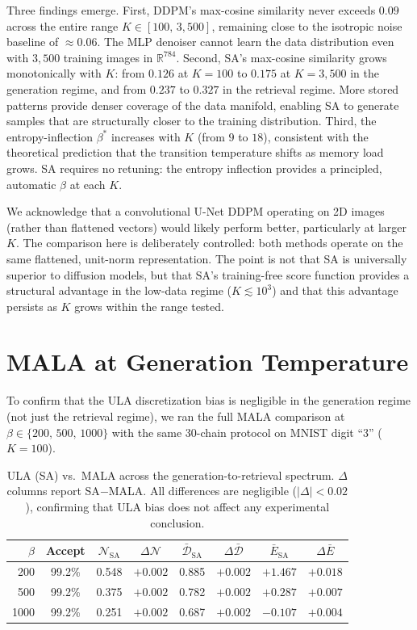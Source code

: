 Three findings emerge. First, DDPM's max-cosine similarity never exceeds $0.09$ across the entire range $K\in[100,\,3{,}500]$, remaining close to the isotropic noise baseline of ${\approx}0.06$. The MLP denoiser cannot learn the data distribution even with $3{,}500$ training images in $\mathbb{R}^{784}$. Second, SA's max-cosine similarity grows monotonically with $K$: from $0.126$ at $K{=}100$ to $0.175$ at $K{=}3{,}500$ in the generation regime, and from $0.237$ to $0.327$ in the retrieval regime. More stored patterns provide denser coverage of the data manifold, enabling SA to generate samples that are structurally closer to the training distribution. Third, the entropy-inflection $\beta^*$ increases with $K$ (from $9$ to $18$), consistent with the theoretical prediction that the transition temperature shifts as memory load grows. SA requires no retuning: the entropy inflection provides a principled, automatic $\beta$ at each $K$.

We acknowledge that a convolutional U-Net DDPM operating on 2D images (rather than flattened vectors) would likely perform better, particularly at larger $K$. The comparison here is deliberately controlled: both methods operate on the same flattened, unit-norm representation. The point is not that SA is universally superior to diffusion models, but that SA's training-free score function provides a structural advantage in the low-data regime ($K\lesssim 10^3$) and that this advantage persists as $K$ grows within the range tested.

\section{MALA at Generation Temperature}\label{app:mala-generation}

To confirm that the ULA discretization bias is negligible in the generation regime (not just the retrieval regime), we ran the full MALA comparison at $\beta\in\{200,\,500,\,1000\}$ with the same 30-chain protocol on MNIST digit ``3'' ($K{=}100$).

\begin{table}[h]
\centering
\caption{ULA (SA) vs.\ MALA across the generation-to-retrieval spectrum. $\Delta$ columns report SA$-$MALA. All differences are negligible ($|\Delta|<0.02$), confirming that ULA bias does not affect any experimental conclusion.}
\label{tab:mala-generation}
\small
\begin{tabular}{@{}rccccccc@{}}
\toprule
$\beta$ & Accept & $\mathcal{N}_{\text{SA}}$ & $\Delta\mathcal{N}$ & $\bar{\mathcal{D}}_{\text{SA}}$ & $\Delta\bar{\mathcal{D}}$ & $\bar{E}_{\text{SA}}$ & $\Delta\bar{E}$ \\
\midrule
200  & 99.2\% & 0.548 & $+0.002$ & 0.885 & $+0.002$ & $+1.467$ & $+0.018$ \\
500  & 99.2\% & 0.375 & $+0.002$ & 0.782 & $+0.002$ & $+0.287$ & $+0.007$ \\
1000 & 99.2\% & 0.251 & $+0.002$ & 0.687 & $+0.002$ & $-0.107$ & $+0.004$ \\
\bottomrule
\end{tabular}
\end{table}

